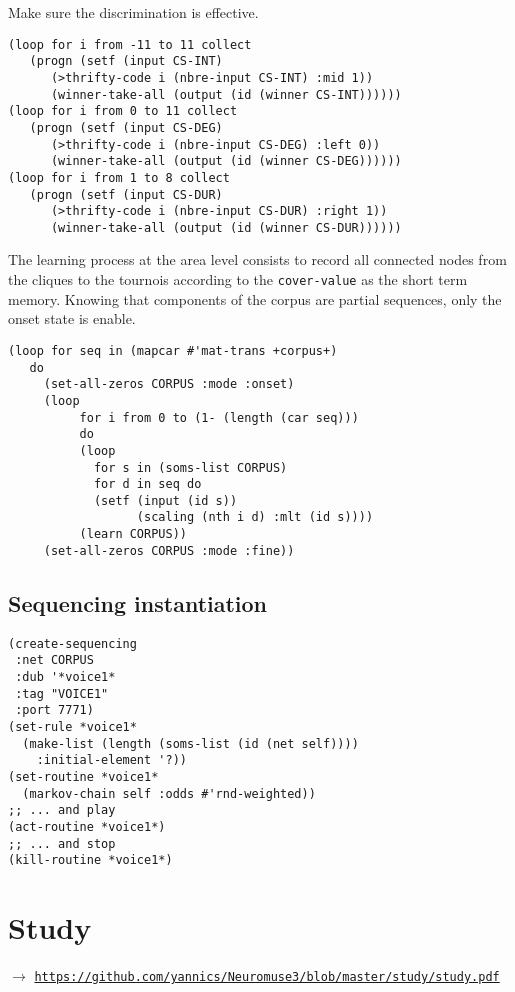 Make sure the discrimination is effective. 
\begin{lstlisting}[language=N3]
(loop for i from -11 to 11 collect 
   (progn (setf (input CS-INT) 
      (>thrifty-code i (nbre-input CS-INT) :mid 1)) 
      (winner-take-all (output (id (winner CS-INT))))))
(loop for i from 0 to 11 collect 
   (progn (setf (input CS-DEG) 
      (>thrifty-code i (nbre-input CS-DEG) :left 0)) 
      (winner-take-all (output (id (winner CS-DEG))))))
(loop for i from 1 to 8 collect 
   (progn (setf (input CS-DUR) 
      (>thrifty-code i (nbre-input CS-DUR) :right 1)) 
      (winner-take-all (output (id (winner CS-DUR))))))
\end{lstlisting}
The learning process at the area level consists to record all connected nodes from the cliques to the tournois according to the \texttt{cover-value} as the short term memory. Knowing that components of the corpus are partial sequences, only the onset state is enable.
\begin{lstlisting}[language=N3]
(loop for seq in (mapcar #'mat-trans +corpus+)
   do     
     (set-all-zeros CORPUS :mode :onset)  
     (loop
	      for i from 0 to (1- (length (car seq))) 
	      do
	      (loop
	        for s in (soms-list CORPUS)
	        for d in seq do
	        (setf (input (id s)) 
	              (scaling (nth i d) :mlt (id s))))
	      (learn CORPUS))
     (set-all-zeros CORPUS :mode :fine))
\end{lstlisting}

\subsection{Sequencing instantiation}

\begin{lstlisting}[language=N3]
(create-sequencing
 :net CORPUS
 :dub '*voice1*
 :tag "VOICE1"
 :port 7771)
(set-rule *voice1* 
  (make-list (length (soms-list (id (net self)))) 
    :initial-element '?))
(set-routine *voice1* 
  (markov-chain self :odds #'rnd-weighted))
;; ... and play
(act-routine *voice1*)
;; ... and stop
(kill-routine *voice1*)
\end{lstlisting}

\bigskip
\bigskip

\section{Study}
\label{ann:n3b}

$\rightarrow$ \href{https://github.com/yannics/Neuromuse3/blob/master/study/study.pdf}{\texttt{\small https://github.com/yannics/Neuromuse3/blob/master/study/study.pdf}}
